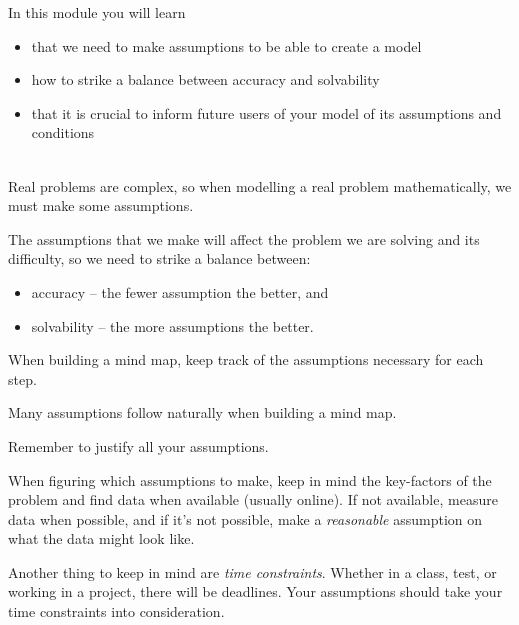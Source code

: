 In this module you will learn
\begin{itemize}
	\item that we need to make assumptions to be able to create a model
	\item how to strike a balance between accuracy and solvability
	\item that it is crucial to inform future users of your model of its assumptions and conditions
\end{itemize}

\hfill \\




Real problems are complex, so when modelling a real problem mathematically, we must make some assumptions. 

The assumptions that we make will affect the problem we are solving and its difficulty, so we need to strike a balance between:
\begin{itemize}
\item accuracy -- the fewer assumption the better, and
\item solvability -- the more assumptions the better.
\end{itemize}

\begin{annotation}
	\begin{goals}
		When building a mind map, keep track of the assumptions necessary for each step.
	\end{goals}
\end{annotation}

Many assumptions follow naturally when building a mind map. \\


\begin{annotation}
	\begin{goals}
		Remember to justify all your assumptions.
	\end{goals}
\end{annotation}

When figuring which assumptions to make, keep in mind the key-factors of the problem and find data when available (usually online). 
If not available, measure data when possible, and if it's not possible, make a \textit{reasonable} assumption on what the data might look like.

Another thing to keep in mind are \emph{time constraints}. Whether in a class, test, or working in a project, there will be deadlines. Your assumptions should take your time constraints into consideration. 




